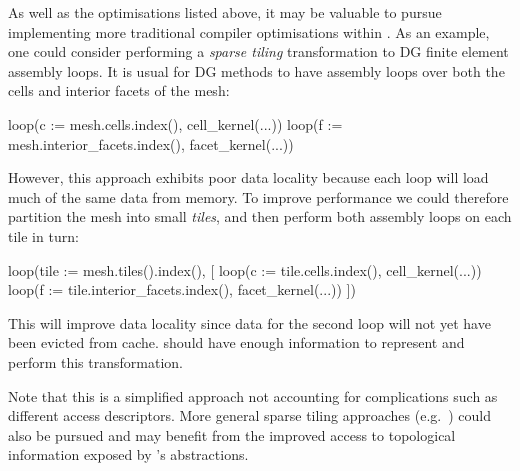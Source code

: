 \documentclass[thesis]{subfiles}
\begin{document}
As well as the optimisations listed above, it may be valuable to pursue implementing more traditional compiler optimisations within .
As an example, one could consider performing a \emph{sparse tiling} transformation to DG finite element assembly loops.
It is usual for DG methods to have assembly loops over both the cells and interior facets of the mesh:
\begin{pyinline}
  loop(c := mesh.cells.index(), cell_kernel(...))
  loop(f := mesh.interior_facets.index(), facet_kernel(...))
\end{pyinline}
However, this approach exhibits poor data locality because each loop will load much of the same data from memory.
To improve performance we could therefore partition the mesh into small \emph{tiles}, and then perform both assembly loops on each tile in turn:
\begin{pyinline}
  loop(tile := mesh.tiles().index(), [
    loop(c := tile.cells.index(), cell_kernel(...))
    loop(f := tile.interior_facets.index(), facet_kernel(...))
  ])
\end{pyinline}
This will improve data locality since data for the second loop will not yet have been evicted from cache.
 should have enough information to represent and perform this transformation.

Note that this is a simplified approach not accounting for complications such as different access descriptors.
More general sparse tiling approaches (e.g.~\cite{kriegerLoopChainingProgramming2013,stroutGeneralizingRunTimeTiling2014,10.1145/3302256}) could also be pursued and may benefit from the improved access to topological information exposed by 's abstractions.
\end{document}
